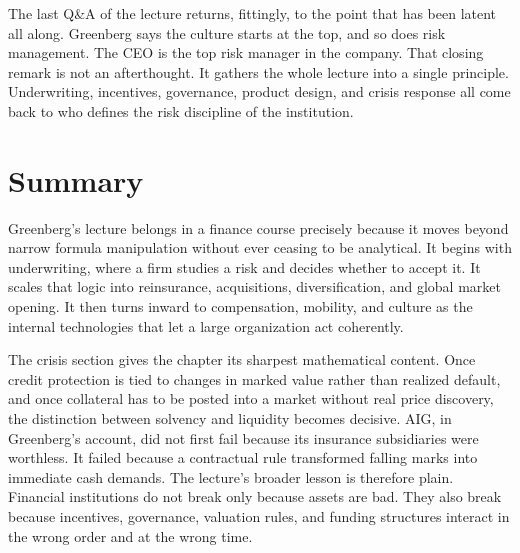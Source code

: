 The last Q\&A of the lecture returns, fittingly, to the point that has been latent all along. Greenberg says the culture starts at the top, and so does risk management. The CEO is the top risk manager in the company. That closing remark is not an afterthought. It gathers the whole lecture into a single principle. Underwriting, incentives, governance, product design, and crisis response all come back to who defines the risk discipline of the institution.

\section{Summary}

Greenberg's lecture belongs in a finance course precisely because it moves beyond narrow formula manipulation without ever ceasing to be analytical. It begins with underwriting, where a firm studies a risk and decides whether to accept it. It scales that logic into reinsurance, acquisitions, diversification, and global market opening. It then turns inward to compensation, mobility, and culture as the internal technologies that let a large organization act coherently.

The crisis section gives the chapter its sharpest mathematical content. Once credit protection is tied to changes in marked value rather than realized default, and once collateral has to be posted into a market without real price discovery, the distinction between solvency and liquidity becomes decisive. AIG, in Greenberg's account, did not first fail because its insurance subsidiaries were worthless. It failed because a contractual rule transformed falling marks into immediate cash demands. The lecture's broader lesson is therefore plain. Financial institutions do not break only because assets are bad. They also break because incentives, governance, valuation rules, and funding structures interact in the wrong order and at the wrong time.
